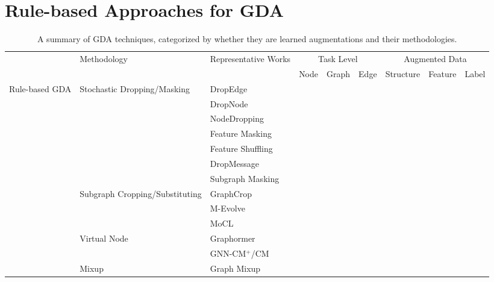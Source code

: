 \documentclass[11pt]{article}
\newcommand{\cmark}{\ding{51}}%
\begin{document}
\section{Rule-based Approaches for GDA}
\label{sec:simpleaug}


\begin{table}[!th]
\scriptsize
\caption{A summary of GDA techniques, categorized by whether they are learned augmentations and their methodologies.}
\label{tab:methods}
\centering
\begin{tabular}{l|l|l|ccc|ccc}
\toprule
\multicolumn{1}{c}{} & \multirow{2}{*}{Methodology} & \multirow{2}{*}{Representative Works} & \multicolumn{3}{|c}{Task Level} & \multicolumn{3}{|c}{Augmented Data}  \\
\multicolumn{2}{c|}{} & & Node & Graph & Edge & Structure & Feature & Label \\
\midrule
\multirow{27}{*}{Rule-based GDA}
& \multirow{7}{*}{Stochastic Dropping/Masking}
& DropEdge~\cite{rong2019dropedge} & \cmark &  &  & \cmark &  &  \\
& & DropNode~\cite{feng2020graph} &  & \cmark &  &  & \cmark &  \\
& & NodeDropping~\cite{you2020graph} &  & \cmark &  & \cmark &  &  \\
& & Feature Masking~\cite{thakoor2022largescale} & \cmark &  &  &  & \cmark &  \\
& & Feature Shuffling~\cite{velickovic2019deep} & \cmark &  &  &  & \cmark &  \\
& & DropMessage~\cite{fang2022dropmessage} & \cmark &  & \cmark &  & \cmark &  \\
& & Subgraph Masking~\cite{you2020graph} &  & \cmark &  & \cmark & \cmark &  \\
\cmidrule(lr){2-9}
& \multirow{3}{*}{Subgraph Cropping/Substituting}
& GraphCrop~\cite{wang2020graphcrop} &  & \cmark &  & \cmark &  &  \\
& & M-Evolve~\cite{zhou2020data} &  & \cmark &  & \cmark &  &  \\
& & MoCL~\cite{sun2021mocl} &  & \cmark &  & \cmark & \cmark &  \\
\cmidrule(lr){2-9}
& \multirow{2}{*}{Virtual Node}
& Graphormer~\cite{ying2021transformers} &  & \cmark &  & \cmark &  &  \\
& & GNN-CM$^+$/CM~\cite{hwang2021revisiting} &  &  & \cmark & \cmark &  &  \\
\cmidrule(lr){2-9}
& \multirow{4}{*}{Mixup}
& Graph Mixup~\cite{wang2021mixup} & \cmark & \cmark &  &  &  & \cmark \\

\end{tabular}
\end{table}
\end{document}
